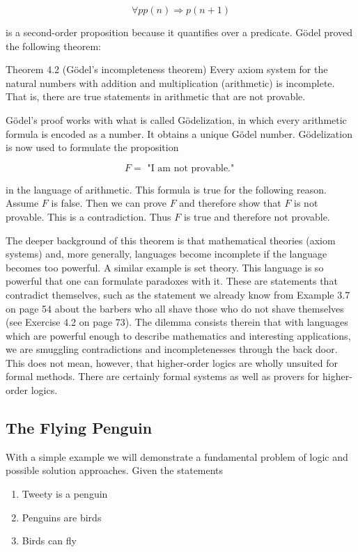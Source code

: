 \documentclass[10pt]{book}
\begin{document}
$$
\forall p p(n) \Rightarrow p(n+1)
$$

is a second-order proposition because it quantifies over a predicate. Gödel proved the following theorem:

\begin{displayquote}
Theorem 4.2 (Gödel's incompleteness theorem) Every axiom system for the natural numbers with addition and multiplication (arithmetic) is incomplete. That is, there are true statements in arithmetic that are not provable.
\end{displayquote}

Gödel's proof works with what is called Gödelization, in which every arithmetic formula is encoded as a number. It obtains a unique Gödel number. Gödelization is now used to formulate the proposition

$$
F=\text { "I am not provable." }
$$

in the language of arithmetic. This formula is true for the following reason. Assume $F$ is false. Then we can prove $F$ and therefore show that $F$ is not provable. This is a contradiction. Thus $F$ is true and therefore not provable.

The deeper background of this theorem is that mathematical theories (axiom systems) and, more generally, languages become incomplete if the language becomes too powerful. A similar example is set theory. This language is so powerful that one can formulate paradoxes with it. These are statements that contradict themselves, such as the statement we already know from Example 3.7 on page 54 about the barbers who all shave those who do not shave themselves (see Exercise 4.2 on page 73). The dilemma consists therein that with languages which are powerful enough to describe mathematics and interesting applications, we are smuggling contradictions and incompletenesses through the back door. This does not mean, however, that higher-order logics are wholly unsuited for formal methods. There are certainly formal systems as well as provers for higher-order logics.

\subsection*{The Flying Penguin}
With a simple example we will demonstrate a fundamental problem of logic and possible solution approaches. Given the statements


\begin{enumerate}
  \item Tweety is a penguin
  \item Penguins are birds
  \item Birds can fly
\end{enumerate}
\end{document}
